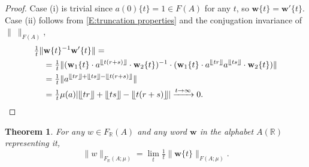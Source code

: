 \documentclass[12pt]{amsart}
\newtheorem{theorem}[prop]{Theorem}
\theoremstyle{definition}
\def\RR{\ensuremath{\mathbb{R}}}
\newcommand{\B}[1]{\mathbf{#1}}
\newcommand{\xto}[1]{\xrightarrow{#1}}
\newcommand{\trc}[1]{\{ #1 \}}   %
\def\Free{F}
\newcommand{\myfloor}[1]{\llfloor #1 \rrfloor}
\begin{document}
\begin{proof}
Case (i) is trivial since $a(0)\trc{t}=1 \in \Free(A)$ for any $t$, so $\B w\trc{t}=\B w'\trc{t}$.
Case (ii) follows from \eqref{E:truncation properties} and the conjugation invariance of $\| \ \|_{\Free(A)}$,
\begin{align*}
\tfrac{1}{t} \| &\B w\trc{t}^{-1}  \B w'\trc{t} \| =
\\
& =\tfrac{1}{t} \| (\B w_1\trc{t} \cdot a^{\myfloor{t(r+s)}} \cdot \B w_2\trc{t})^{-1} \cdot (\B w_1\trc{t} \cdot a^{\myfloor{tr}} a^{\myfloor{ts}} \cdot \B w_2\trc{t})\| 
\\
&= \tfrac{1}{t} \|a^{\myfloor{tr} + \myfloor{ts} -\myfloor{t(r+s)}}\| \\
&= \tfrac{1}{t} \mu(a) |\myfloor{tr} + \myfloor{ts} -\myfloor{t(r+s)}| \xto{t \to \infty} 0.
\end{align*}
\end{proof}






\begin{theorem}\label{T:norm FRA as limit 1/tw[t]}
For any $w \in \Free_\RR(A)$ and any word $\B w$ in the alphabet $A(\RR)$ representing it,
\[
\| w\|_{\Free_\RR(A;\mu)} = \lim_t \tfrac{1}{t}\|\B w\trc{t}\|_{\Free(A;\mu)}.
\]
\end{theorem}
\end{document}

